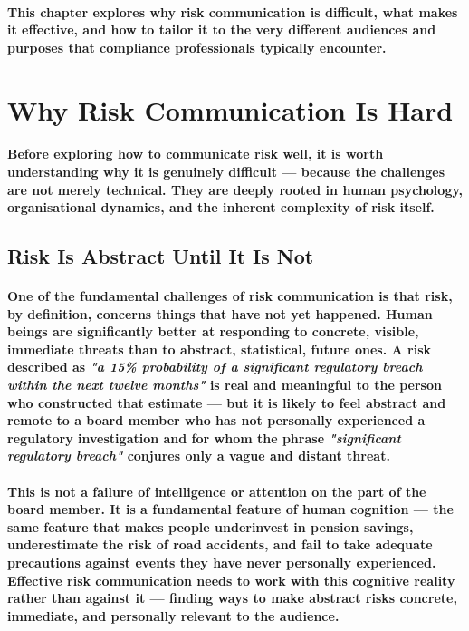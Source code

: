 \paragraph{This chapter explores why risk communication is difficult, what makes it effective, and how to tailor it to the very different audiences and purposes that compliance professionals typically encounter.}

\section{Why Risk Communication Is Hard}

\paragraph{Before exploring how to communicate risk well, it is worth understanding why it is genuinely difficult — because the challenges are not merely technical. They are deeply rooted in human psychology, organisational dynamics, and the inherent complexity of risk itself.}

\subsection{Risk Is Abstract Until It Is Not}
\paragraph{One of the fundamental challenges of risk communication is that risk, by definition, concerns things that have not yet happened. Human beings are significantly better at responding to concrete, visible, immediate threats than to abstract, statistical, future ones. A risk described as \textit{"a 15\% probability of a significant regulatory breach within the next twelve months"} is real and meaningful to the person who constructed that estimate — but it is likely to feel abstract and remote to a board member who has not personally experienced a regulatory investigation and for whom the phrase \textit{"significant regulatory breach"} conjures only a vague and distant threat.}
\paragraph{This is not a failure of intelligence or attention on the part of the board member. It is a fundamental feature of human cognition — the same feature that makes people underinvest in pension savings, underestimate the risk of road accidents, and fail to take adequate precautions against events they have never personally experienced. Effective risk communication needs to work with this cognitive reality rather than against it — finding ways to make abstract risks concrete, immediate, and personally relevant to the audience.}

